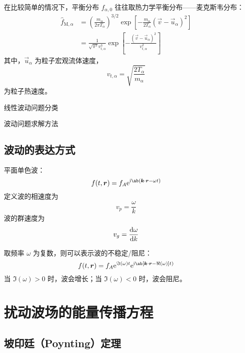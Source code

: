 在比较简单的情况下，平衡分布 $f_{\alpha,0}$ 往往取热力学平衡分布——麦克斯韦分布：
\begin{equation} \label{eq:Maxwell_distribution} \begin{aligned}
\hat{f}_{\text{M}, \alpha}
&= \left(\frac{m_\alpha}{2 \pi T_\alpha}\right)^{3/2}
\exp{\left[- \frac{m_\alpha}{2 T_\alpha} (\vec{v} - \vec{u}_\alpha)^2\right]} \\
&= \frac{1}{\sqrt{\pi^3} v_{t, \alpha}^3}
\exp{\left[- \frac{(\vec{v} - \vec{u}_\alpha)^2}{v_{t, \alpha}^2}\right]}
\end{aligned}\end{equation}
其中，$\vec{u}_\alpha$ 为粒子宏观流体速度，
\begin{equation}
v_{t, \alpha} = \sqrt{\frac{2 T_\alpha}{m_\alpha}}
\end{equation}
为粒子热速度。

线性波动问题分类

波动问题求解方法

\subsection{波动的表达方式}

平面单色波：
\begin{equation}
f(t,\vec{r}) = f_A \eu^{\im\ab(\vec{k}\cdot\vec{r} - \omega t)}
\end{equation}
定义波的相速度为
\begin{equation}
v_p = \frac{\omega}{k}
\end{equation}
波的群速度为
\begin{equation}
v_g = \odv{\omega}{k}
\end{equation}

取频率 $\omega$ 为复数，则可以表示波的不稳定/阻尼：
\begin{equation}
f(t,\vec{r}) = f_A \eu^{\Im(\omega) t} \eu^{\im\ab[\vec{k}\cdot\vec{r} - \Re(\omega)] t)}
\end{equation}
当 $\Im(\omega)>0$ 时，波会增长；当 $\Im(\omega)<0$ 时，波会阻尼。

\section{扰动波场的能量传播方程}

\subsection{坡印廷（Poynting）定理}

